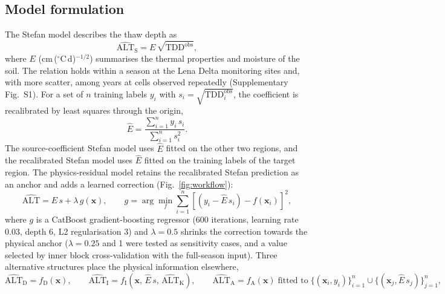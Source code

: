 \subsection{Model formulation}
The Stefan model describes the thaw depth as
\begin{equation}
\widehat{\mathrm{ALT}}_{\mathrm{S}} = E\,\sqrt{\mathrm{TDD}^{\mathrm{obs}}},
\label{eq:stefan}
\end{equation}
where $E$ (cm\,($^\circ$C\,d)$^{-1/2}$) summarises the thermal properties and moisture of the soil\cite{Stefan1891,Riseborough2008}. The relation holds within a season at the Lena Delta monitoring sites and, with more scatter, among years at cells observed repeatedly (Supplementary Fig.~S1). For a set of $n$ training labels $y_i$ with $s_i = \sqrt{\mathrm{TDD}^{\mathrm{obs}}_i}$, the coefficient is recalibrated by least squares through the origin,
\begin{equation}
\hat{E} = \frac{\sum_{i=1}^{n} y_i\, s_i}{\sum_{i=1}^{n} s_i^{2}}.
\label{eq:E}
\end{equation}
The source-coefficient Stefan model uses $\hat{E}$ fitted on the other two regions, and the recalibrated Stefan model uses $\hat{E}$ fitted on the training labels of the target region. The physics-residual model retains the recalibrated Stefan prediction as an anchor and adds a learned correction (Fig.~\ref{fig:workflow}):
\begin{equation}
\widehat{\mathrm{ALT}} = \hat{E}\, s + \lambda\, g(\mathbf{x}), \qquad g = \arg\min_{f} \sum_{i=1}^{n} \left[ \left( y_i - \hat{E}\, s_i \right) - f(\mathbf{x}_i) \right]^{2},
\label{eq:residual}
\end{equation}
where $g$ is a CatBoost gradient-boosting regressor\cite{Prokhorenkova2018} (600 iterations, learning rate 0.03, depth 6, L2 regularisation 3) and $\lambda=0.5$ shrinks the correction towards the physical anchor ($\lambda = 0.25$ and 1 were tested as sensitivity cases, and a value selected by inner block cross-validation with the full-season input). Three alternative structures place the physical information elsewhere,
\begin{equation}
\widehat{\mathrm{ALT}}_{\mathrm{D}} = f_{\mathrm{D}}(\mathbf{x}), \qquad
\widehat{\mathrm{ALT}}_{\mathrm{I}} = f_{\mathrm{I}}\!\left(\mathbf{x},\, \hat{E}\,s,\, \widehat{\mathrm{ALT}}_{\mathrm{K}}\right), \qquad
\widehat{\mathrm{ALT}}_{\mathrm{A}} = f_{\mathrm{A}}(\mathbf{x}) \;\text{fitted to}\; \{(\mathbf{x}_i, y_i)\}_{i=1}^{n} \cup \{(\mathbf{x}_j, \hat{E}\,s_j)\}_{j=1}^{n},
\label{eq:alt}
\end{equation}
